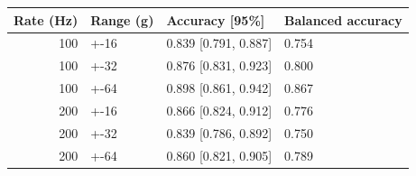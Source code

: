 \begin{tabular}{rlll}
\toprule
Rate (Hz) & Range (g) & Accuracy [95\%] & Balanced accuracy \\
\midrule
100 & +-16 & 0.839 [0.791, 0.887] & 0.754 \\
100 & +-32 & 0.876 [0.831, 0.923] & 0.800 \\
100 & +-64 & 0.898 [0.861, 0.942] & 0.867 \\
200 & +-16 & 0.866 [0.824, 0.912] & 0.776 \\
200 & +-32 & 0.839 [0.786, 0.892] & 0.750 \\
200 & +-64 & 0.860 [0.821, 0.905] & 0.789 \\
\bottomrule
\end{tabular}
